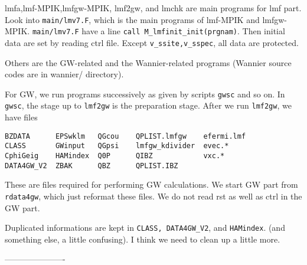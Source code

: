 \documentclass[a4paper,10pt,fleqn]{article}
\begin{document}
lmfa,lmf-MPIK,lmfgw-MPIK, lmf2gw, and lmchk
are main programs for lmf part. 
Look into \verb#main/lmv7.F#, which is the main programs of lmf-MPIK and lmfgw-MPIK.
\verb#main/lmv7.F# have a line \verb#call M_lmfinit_init(prgnam)#.
Then initial data are set by reading ctrl file.
Except \verb#v_ssite,v_sspec#, all data are protected.

Others are the GW-related and 
the Wannier-related programs (Wannier source codes are in wannier/ directory).

For GW, we run programs successively as given by scripts \verb#gwsc# and so on. 
In \verb#gwsc#, the stage up to \verb#lmf2gw# is the preparation stage.
After we run \verb#lmf2gw#, we have files
\begin{verbatim}
BZDATA      EPSwklm   QGcou    QPLIST.lmfgw    efermi.lmf  
CLASS       GWinput   QGpsi    lmfgw_kdivider  evec.* 
CphiGeig    HAMindex  Q0P      QIBZ            vxc.*        
DATA4GW_V2  ZBAK      QBZ      QPLIST.IBZ                
\end{verbatim}
These are files required for performing GW calculations. 
We start GW part from \verb#rdata4gw#, which just reformat these files.
We do not read rst as well as ctrl in the GW part.

Duplicated informations are kept in 
\verb#CLASS, DATA4GW_V2#, and \verb#HAMindex#. 
(and something else, a little confusing).
I think we need to clean up a little more.

----------------------
\end{document}
